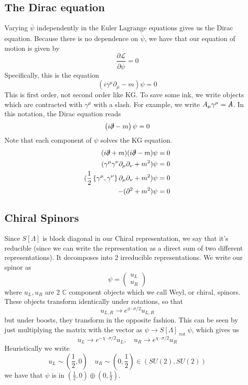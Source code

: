 \subsection{The Dirac equation} 
Varying $ \overline{ \psi } $ independently 
in the Euler Lagrange equations gives us the Dirac equation.
Because there is no dependence on $ \dot{ \overline{ \psi } }  $, 
we have that our equation of motion is given by 
\[
 \frac{\partial  \mathcal{L } }{\partial  \overline{ \psi } }   = 0 
\] 
Specifically, this is the equation 
\[
 \left(  i \gamma ^ \mu \partial  _ \mu - m  \right)  \psi  =0 
\] This is first order, not second order like KG.
To save some ink, we write 
objects which are contracted with $ \gamma ^ \mu $ with 
a slash. For example, we write $ A _ \mu \gamma ^ \mu = \slashed{ A } $. In this notation, 
the Dirac equation reads  
 \[
	 \left(  i \slashed{\partial } - m  \right)  \psi = 0 
\] Note that each component of $ \psi $ solves
the KG equation. 
\begin{align*}
	( i \slashed{\partial} + m ) ( i \slashed {\partial} - m ) \psi &=  0  \\
	( \gamma ^ \mu \gamma ^ \nu \partial  _ \mu \partial  _ \nu + m ^ 2 ) \psi &=  0  \\ 
	( \frac{1}{2 } \left\{  \gamma ^ \mu , \gamma ^ \nu  \right\}  \partial  _ \mu \partial  _ \nu + m^ 2 ) \psi &  = 0 \\
	- ( \partial  ^ 2 + m ^ 2 ) \psi & = 0 
\end{align*}

\subsection{Chiral Spinors} 
Since $ S [ \Lambda ] $ is block diagonal in our 
Chiral representation, we say that it's reducible (since 
we can write the representation as a direct sum of 
two different representations). 
It decomposes into 2 irreducible representations. 
We write our spinor as 
\[
 \psi = \begin{pmatrix} u _ L \\ u _ R  \end{pmatrix} 
\] where $ u_L , u _ R $ are 2 $ \mathbb{ C } $ component objects
which we call Weyl, or chiral, spinors. 
These objects transform identically under rotations, so that 
\[
 u _{ L, R } \to e ^{ \phi \cdot  \sigma / 2 } u _{ L , R }
\] but under boosts, they transform in the opposite fashion. This 
can be seen by just multiplying the matrix with the vector 
as $ \psi \to S[ \Lambda ]_{ \text{ rot } } \psi $, which gives us 
\[
 u _{ L } \to e ^{ - \chi \cdot  \sigma / 2 } u_L  , \quad u _{ R } \to e ^{ \chi \cdot  \sigma / 2 } u _ R
\] Heuristically we write 
\[
	u _{ L } \sim ( \frac{1}{2 } , 0 )\quad u _{ R } \sim ( 0 , \frac{1}{2 } ) \in ( SU ( 2) , SU ( 2) ) 
\] we have that $ \psi $ is in $ ( \frac{1}{2 } , 0 ) \oplus ( 0 , \frac{1}{2 } ) $. 

